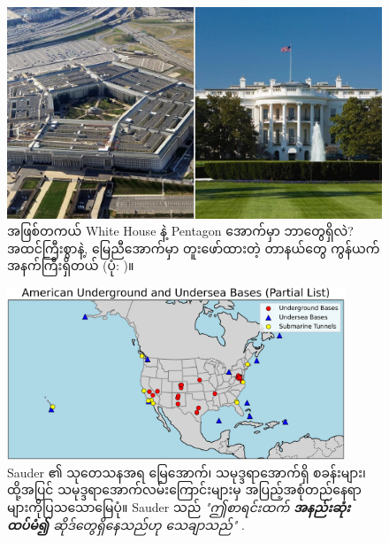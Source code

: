 \documentclass[10pt,twocolumn,letterpaper]{article}
\begin{document}
\begin{figure}[b]

\begin{center}
   \includegraphics[width=1\linewidth]{penta.jpg}
\end{center}
   \caption{အဖြစ်တကယ် White House နဲ့ Pentagon အောက်မှာ ဘာတွေရှိလဲ? အထင်ကြီးစွာနဲ့, မြေညီအောက်မှာ တူးဖော်ထားတဲ့ တာနယ်တွေ ကွန်ယက်အနက်ကြီးရှိတယ် (ပုံ: \cite{31})။}
\label{fig:3}
\label{fig:onecol}
\end{figure}
\begin{figure}[t]
\begin{center}
\includegraphics[width=0.9\textwidth]{basescrop.png}
\end{center}
   \caption{Sauder ၏ သုတေသနအရ မြေအောက်၊ သမုဒ္ဒရာအောက်ရှိ စခန်းများ၊ ထို့အပြင် သမုဒ္ဒရာအောက်လမ်းကြောင်းများမှ အပြည့်အစုံတည်နေရာများကိုပြသသောမြေပုံ။ Sauder သည် \textit{"ဤစာရင်းထက် \textbf{အနည်းဆုံး ထပ်မံ၍} ဆိုဒ်တွေရှိနေသည်ဟု သေချာသည်"} \cite{22}.}
   \label{fig:4}
\end{figure}
\end{document}
